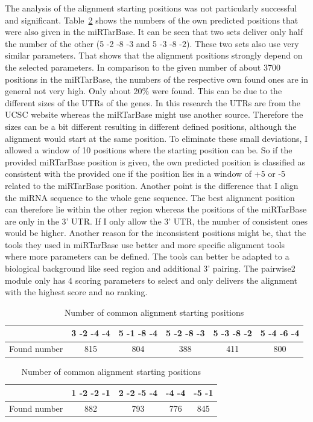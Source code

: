 \documentclass[11pt,  a4paper]{report}
\begin{document}
The analysis of the alignment starting positions was not particularly successful and significant. Table~\ref{tab:positions} shows the numbers of the own predicted positions that were also given in the miRTarBase. It can be seen that two sets deliver only half the number of the other (5 -2 -8 -3 and 5 -3 -8 -2). These two sets also use very similar parameters. That shows that the alignment positions strongly depend on the selected parameters. In comparison to the given number of about 3700 positions in the miRTarBase, the numbers of the respective own found ones are in general not very high. Only about 20\% were found. This can be due to the different sizes of the UTRs of the genes. In this research the UTRs are from the UCSC website whereas the miRTarBase might use another source. Therefore the sizes can be a bit different resulting in different defined positions, although the alignment would start at the same position. To eliminate these small deviations, I allowed a window of 10 positions where the starting position can be. So if the provided miRTarBase position is given, the own predicted position is classified as consistent with the provided one if the position lies in a window of +5 or -5 related to the miRTarBase position. Another point is the difference that I align the miRNA sequence to the whole gene sequence. The best alignment position can therefore lie within the other region whereas the positions of the miRTarBase are only in the 3' UTR. If I only allow the 3' UTR, the number of consistent ones would be higher. Another reason for the inconsistent positions might be, that the tools they used in miRTarBase use better and more specific alignment tools where more parameters can be defined. The tools can better be adapted to a biological background like seed region and additional 3' pairing. The pairwise2 module only has 4 scoring parameters to select and only delivers the alignment with the highest score and no ranking.  \\



\begin{table}
\caption{Number of common alignment starting positions}
\vspace{0.3cm}
\begin{tabular}{c||c|c|c|c|c} 
& 3 -2 -4 -4 & 5 -1 -8 -4 & 5 -2 -8 -3 & 5 -3 -8 -2 & 5 -4 -6 -4  \\
\hline\hline
Found number & 815 & 804 & 388 & 411 & 800\\
\hline
\end{tabular}
\vspace{0.5cm}

\begin{tabular}{c||c|c|c|c}
& 1 -2 -2 -1 & 2 -2 -5 -4 & -4 -4 & -5 -1 \\
\hline\hline
Found number & 882 & 793 & 776 & 845  \\
\hline
\end{tabular}
\label{tab:positions}
\end{table}
\end{document}
